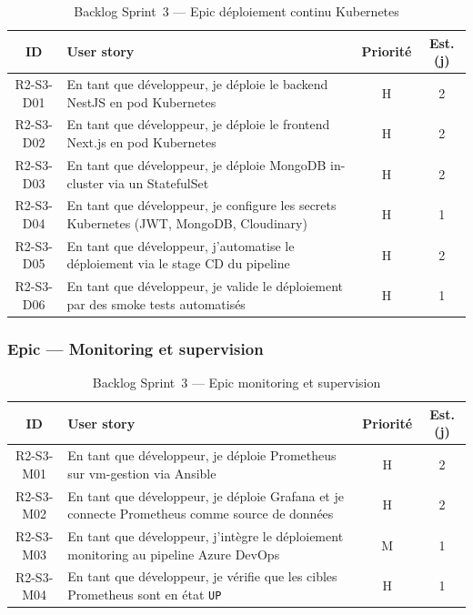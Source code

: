 \begin{table}[H]
\centering
\caption{Backlog Sprint~3 — Epic déploiement continu Kubernetes}
\label{tab:r2-s3-backlog-deploy}
\footnotesize
\renewcommand{\arraystretch}{0.85}
\setlength{\tabcolsep}{4pt}
\begin{tabular}{|c|p{7.8cm}|c|c|}
\hline
\textbf{ID} & \textbf{User story} & \textbf{Priorité} & \textbf{Est. (j)} \\
\hline
R2-S3-D01 &
  En tant que développeur, je déploie le backend NestJS en pod Kubernetes &
  H & 2 \\
\hline
R2-S3-D02 &
  En tant que développeur, je déploie le frontend Next.js en pod Kubernetes &
  H & 2 \\
\hline
R2-S3-D03 &
  En tant que développeur, je déploie MongoDB in-cluster via un StatefulSet &
  H & 2 \\
\hline
R2-S3-D04 &
  En tant que développeur, je configure les secrets Kubernetes (JWT, MongoDB, Cloudinary) &
  H & 1 \\
\hline
R2-S3-D05 &
  En tant que développeur, j'automatise le déploiement via le stage CD du pipeline &
  H & 2 \\
\hline
R2-S3-D06 &
  En tant que développeur, je valide le déploiement par des smoke tests automatisés &
  H & 1 \\
\hline
\end{tabular}
\end{table}

\subsubsection{Epic — Monitoring et supervision}

\begin{table}[H]
\centering
\caption{Backlog Sprint~3 — Epic monitoring et supervision}
\label{tab:r2-s3-backlog-monitoring}
\footnotesize
\renewcommand{\arraystretch}{0.85}
\setlength{\tabcolsep}{4pt}
\begin{tabular}{|c|p{7.8cm}|c|c|}
\hline
\textbf{ID} & \textbf{User story} & \textbf{Priorité} & \textbf{Est. (j)} \\
\hline
R2-S3-M01 &
  En tant que développeur, je déploie Prometheus sur vm-gestion via Ansible &
  H & 2 \\
\hline
R2-S3-M02 &
  En tant que développeur, je déploie Grafana et je connecte Prometheus comme source de données &
  H & 2 \\
\hline
R2-S3-M03 &
  En tant que développeur, j'intègre le déploiement monitoring au pipeline Azure DevOps &
  M & 1 \\
\hline
R2-S3-M04 &
  En tant que développeur, je vérifie que les cibles Prometheus sont en état \texttt{UP} &
  H & 1 \\
\hline
\end{tabular}
\end{table}


